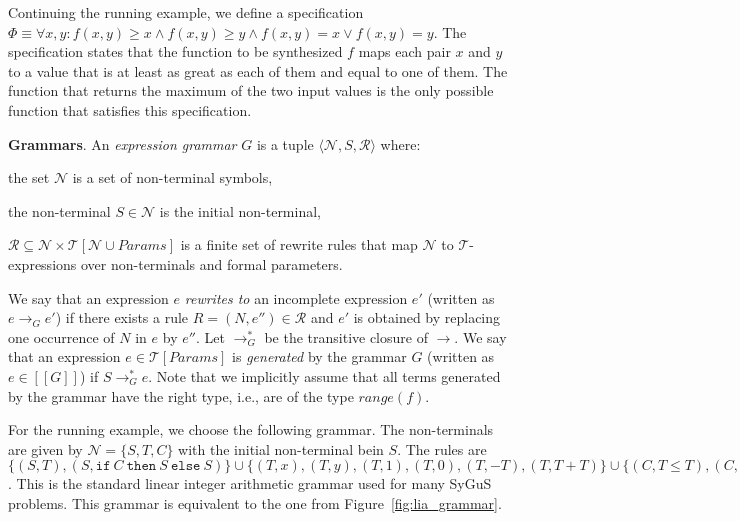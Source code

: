 \documentclass{llncs}
\newcommand\tuple[1]{\langle #1 \rangle}
\newcommand\Expr{e}
\newcommand\Spec{\Phi}
\newcommand\Grammar{G}
\newcommand\sem[1]{[\![ #1 ]\!]}
\newcommand\SynthFun{f}
\newcommand\range{\mathit{range}}
\newcommand\FormalParameters{\mathit{Params}}
\newcommand\NonTerminals{\mathcal{N}}
\newcommand\NonTerminal{N}
\newcommand\StartSymbol{S}
\newcommand\Rules{\mathcal{R}}
\newcommand\Rule{R}
\newcommand\Theory{\mathcal{T}}
\newcommand\RewritesTo{\rightarrow}
\newcommand\ITE[3]{\mathtt{if}~#1~\mathtt{then}~#2~\mathtt{else}~#3}
\renewcommand{\paragraph}[1]{\par\noindent\textbf{#1}.}
\begin{document}
\begin{example}
  \label{ex:running:spec}
  Continuing the running example, we define a specification $\Spec
  \equiv \forall x, y : \SynthFun(x, y) \geq x \wedge \SynthFun(x, y)
  \geq y \wedge f(x, y) = x \vee f(x, y) = y$.
  The specification states that the function to be synthesized
  $\SynthFun$ maps each pair $x$ and $y$ to a value that is at least as
  great as each of them and equal to one of them.
  The function that returns the maximum of the two input values is the
  only possible function that satisfies this specification.
\end{example}

\paragraph{Grammars}
An {\em expression grammar} $\Grammar$ is a tuple $\tuple {
\NonTerminals, \StartSymbol, \Rules }$ where:
\begin{inparaenum}[(a)]
\item the set $\NonTerminals$ is a set of non-terminal symbols,
\item the non-terminal $\StartSymbol \in \NonTerminals$ is the initial non-terminal,
\item $\Rules \subseteq \NonTerminals \times
  \Theory[\NonTerminals \cup \FormalParameters]$ is a finite set
  of rewrite rules that map $\NonTerminals$ to $\Theory$-expressions
  over non-terminals and formal parameters.
\end{inparaenum}
We say that an expression $\Expr$ {\em rewrites to} an incomplete
expression $\Expr'$ (written as $\Expr \RewritesTo_\Grammar \Expr'$) if
there exists a rule $\Rule = (\NonTerminal, \Expr'') \in \Rules$ and
$\Expr'$ is obtained by replacing one occurrence of $\NonTerminal$ in
$\Expr$ by $\Expr''$.
Let $\RewritesTo_\Grammar^*$ be the transitive closure of $\RewritesTo$.
We say that an expression $\Expr \in \Theory[\FormalParameters]$
is {\em generated} by the grammar $\Grammar$ (written as $\Expr \in
\sem{\Grammar}$) if $\StartSymbol \RewritesTo_\Grammar^* \Expr$.
Note that we implicitly assume that all terms generated by the grammar
have the right type, i.e., are of the type $\range(\SynthFun)$.

\begin{example}
  \label{ex:running:grammar}
  For the running example, we choose the following grammar.
  The non-terminals are given by $\NonTerminals = \{ \StartSymbol, T, C \}$ with
  the initial non-terminal bein $\StartSymbol$.
  The rules are $\{ (\StartSymbol, T), (\StartSymbol,
      \ITE{C}{\StartSymbol}{\StartSymbol})
    \} \cup \{ (T, x), (T, y), (T, 1), (T, 0), (T, - T), (T, T + T) \} \cup
        \{ (C, T \leq T), (C, C \wedge C), (C, \neg C) \}$.
  This is the standard linear integer arithmetic grammar used for many
  SyGuS problems.
  This grammar is equivalent to the one from
  Figure~\ref{fig:lia_grammar}.
\end{example}
\end{document}
